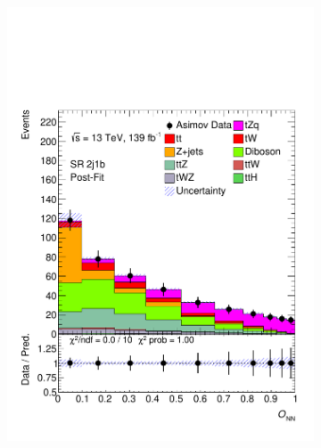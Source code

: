 \begin{figure}[!h]
\begin{subfigure}[b]{0.33\linewidth}
    \includegraphics[width=\textwidth]{ubonn-thesis/Chapters/Chapters_07/Figure/Asmiov/SR_2j1b_postFit.pdf} 
  \end{subfigure} 
  \begin{subfigure}[b]{0.33\linewidth}
    \centering

\end{subfigure}
\end{figure}

